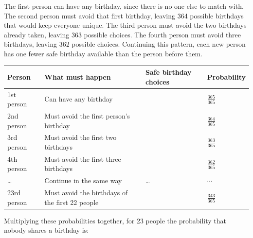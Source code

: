 \documentclass[
  letterpaper,
  DIV=11,
  numbers=noendperiod]{scrreprt}
\newcounter{none} %
\begin{document}
The first person can have any birthday, since there is no one else to
match with. The second person must avoid that first birthday, leaving
364 possible birthdays that would keep everyone unique. The third person
must avoid the two birthdays already taken, leaving 363 possible
choices. The fourth person must avoid three birthdays, leaving 362
possible choices. Continuing this pattern, each new person has one fewer
safe birthday available than the person before them.

{\def\LTcaptype{none} %
\begin{longtable}[]{@{}
  >{\raggedright\arraybackslash}p{}
  >{\raggedright\arraybackslash}p{}
  >{\raggedright\arraybackslash}p{}
  >{\raggedright\arraybackslash}p{}@{}}
\toprule\noalign{}
\begin{minipage}[b]{\linewidth}\raggedright
Person
\end{minipage} & \begin{minipage}[b]{\linewidth}\raggedright
What must happen
\end{minipage} & \begin{minipage}[b]{\linewidth}\raggedright
Safe birthday choices
\end{minipage} & \begin{minipage}[b]{\linewidth}\raggedright
Probability
\end{minipage} \\
\midrule\noalign{}
\endhead
\bottomrule\noalign{}
\endlastfoot
1st person & Can have any birthday & 365 & \(\frac{365}{365}\) \\
2nd person & Must avoid the first person's birthday & 364 &
\(\frac{364}{365}\) \\
3rd person & Must avoid the first two birthdays & 363 &
\(\frac{363}{365}\) \\
4th person & Must avoid the first three birthdays & 362 &
\(\frac{362}{365}\) \\
\ldots{} & Continue in the same way & \ldots{} & \(\cdots\) \\
23rd person & Must avoid the birthdays of the first 22 people & 343 &
\(\frac{343}{365}\) \\
\end{longtable}
}

Multiplying these probabilities together, for 23 people the probability
that nobody shares a birthday is:
\end{document}
